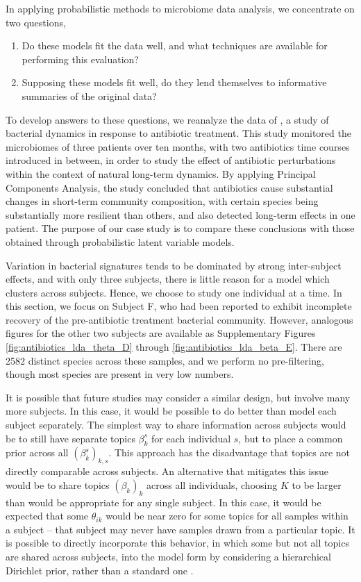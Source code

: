 In applying probabilistic methods to microbiome data analysis, we concentrate on
two questions,
\begin{enumerate}
\item Do these models fit the data well, and what techniques are available for
  performing this evaluation?
\item Supposing these models fit well, do they lend themselves to informative
  summaries of the original data?
\end{enumerate}

To develop answers to these questions, we reanalyze the data of
\cite{dethlefsen2011incomplete}, a study of bacterial dynamics in response to
antibiotic treatment. This study monitored the microbiomes of three patients
over ten months, with two antibiotics time courses introduced in between, in
order to study the effect of antibiotic perturbations within the context of
natural long-term dynamics. By applying Principal Components Analysis, the study
concluded that antibiotics cause substantial changes in short-term community
composition, with certain species being substantially more resilient than
others, and also detected long-term effects in one patient. The purpose of our
case study is to compare these conclusions with those obtained through
probabilistic latent variable models.

Variation in bacterial signatures tends to be dominated by strong inter-subject
effects, and with only three subjects, there is little reason for a model which
clusters across subjects. Hence, we choose to study one individual at a time. In
this section, we focus on Subject F, who had been reported to exhibit incomplete
recovery of the pre-antibiotic treatment bacterial community. However, analogous
figures for the other two subjects are available as Supplementary Figures
\ref{fig:antibiotics_lda_theta_D} through \ref{fig:antibiotics_lda_beta_E}.
There are 2582 distinct species across these samples, and we perform no
pre-filtering, though most species are present in very low numbers.

It is possible that future studies may consider a similar design, but involve
many more subjects. In this case, it would be possible to do better than model
each subject separately. The simplest way to share information across subjects
would be to still have separate topics $\beta_{k}^{s}$ for each individual $s$,
but to place a common prior across all $\left(\beta_{k}^{s}\right)_{k, s}$. This
approach has the disadvantage that topics are not directly comparable across
subjects. An alternative that mitigates this issue would be to share topics
$\left(\beta_{k}\right)_{k}$ across all individuals, choosing $K$ to be larger
than would be appropriate for any single subject. In this case, it would be
expected that some $\theta_{ik}$ would be near zero for some topics for all
samples within a subject -- that subject may never have samples drawn from a
particular topic. It is possible to directly incorporate this behavior, in which
some but not all topics are shared across subjects, into the model form by
considering a hierarchical Dirichlet prior, rather than a standard one
\citep{teh2005sharing}.

